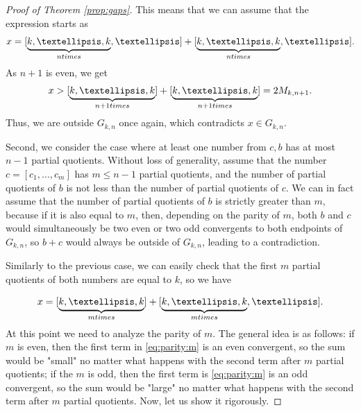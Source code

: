 \documentclass{amsart}
\theoremstyle{definition}
\newcommand{\0}{\mbf 0}%
\renewcommand{\text}{\textup}
\begin{document}
\begin{proof}[Proof of Theorem \ref{prop:gaps}]

This means that we can assume that the expression starts as
$$
x = [\underbrace{k,\ldots,k}_{n \text{ times }},\ldots] + [\underbrace{k,\ldots,k}_{n \text{ times }},\ldots].
$$
As $n+1$ is even, we get
$$
x > [\underbrace{k,\ldots,k}_{n+1 \text{ times }}] + [\underbrace{k,\ldots,k}_{n+1 \text{ times }}] = 2M_{k,n+1}.
$$
Thus, we are outside $G_{k,n}$ once again, which contradicts $x\in G_{k,n}$.

Second, we consider the case where at least one number from $c,b$ has at most $n-1$ partial quotients. Without loss of generality, assume that the number $c=[c_1,\ldots,c_m]$ has  $m\leq n-1$ partial quotients, and the number of partial quotients of $b$ is not less than the number of partial quotients of $c$. We can in fact assume that the number of partial quotients of $b$ is strictly greater than $m$, because if it is also equal to $m$, then, depending on the parity of $m$, both $b$ and $c$ would simultaneously be two even or two odd convergents to both endpoints of $G_{k,n}$, so $b+c$ would always be outside of $G_{k,n}$, leading to a contradiction.

Similarly to the previous case, we can easily check that the first $m$ partial quotients of both numbers are equal to $k$, so we have

\begin{equation}\label{eq:parity:m}
x = [\underbrace{k,\ldots,k}_{m \text{ times }}] + [\underbrace{k,\ldots,k}_{m \text{ times }},\ldots].
\end{equation}
At this point we need to analyze the parity of $m$. The general idea is as follows: if $m$ is even, then the first term in \eqref{eq:parity:m} is an even convergent, so the sum would be "small" no matter what happens with the second term after $m$ partial quotients; if the $m$ is odd, then the first term is \eqref{eq:parity:m} is an odd convergent, so the sum would be "large" no matter what happens with the second term after $m$ partial quotients. Now, let us show it rigorously.


\end{proof}
\end{document}
